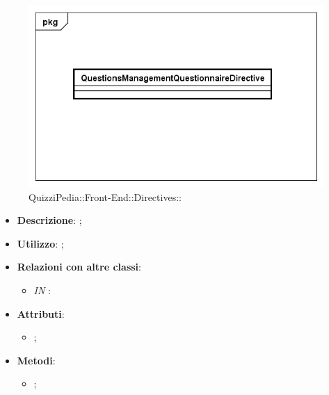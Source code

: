 \begin{figure}[h]
	\centering
	\includegraphics[scale=0.5,keepaspectratio]{UML/Classi/Front-End/QuizziPedia_Front-end_Directives_QuestionsManagementQuestionnaireDirective.png}
	\caption{QuizziPedia::Front-End::Directives::}
\end{figure}

\begin{itemize}
	\item \textbf{Descrizione}: ;
	\item \textbf{Utilizzo}: ;
	\item \textbf{Relazioni con altre classi}: 
	\begin{itemize}
		\item \textit{IN} \texttt{}: 
	\end{itemize}
	\item \textbf{Attributi}: 
	\begin{itemize}
		\item ;
	\end{itemize}
	\item \textbf{Metodi}: 
	\begin{itemize}
		\item ;
	\end{itemize}
\end{itemize}